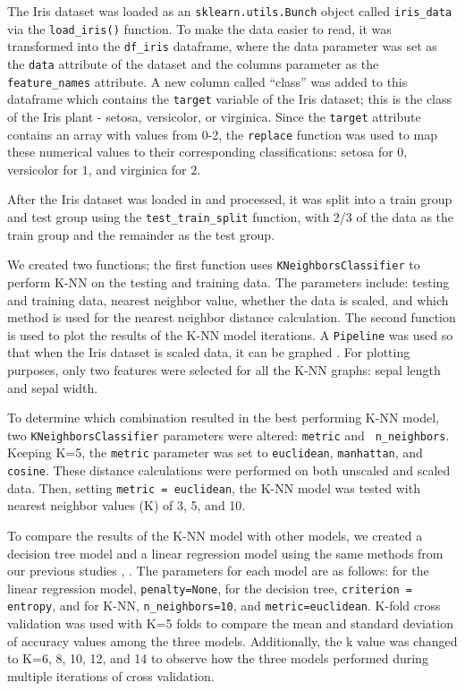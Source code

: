 \documentclass[journal]{IEEEtran}
\begin{document}
The Iris dataset was loaded as an \lstinline{sklearn.utils.Bunch} object called \lstinline{iris_data} via the \lstinline{load_iris()} function. To make the data easier to read, it was transformed into the \lstinline{df_iris} dataframe, where the data parameter was set as the \lstinline{data} attribute of the dataset and the columns parameter as the \lstinline{feature_names} attribute. A new column called “class” was added to this dataframe which contains the \lstinline{target} variable of the Iris dataset; this is the class of the Iris plant - setosa, versicolor, or virginica. Since the \lstinline{target} attribute contains an array with values from 0-2, the \lstinline{replace} function was used to map these numerical values to their corresponding classifications: setosa for \(0\), versicolor for \(1\), and virginica for \(2\). 

After the Iris dataset was loaded in and processed, it was split into a train group and test group using the \lstinline{test_train_split} function, with 2/3 of the data as the train group and the remainder as the test group. 

We created two functions; the first function uses \lstinline{KNeighborsClassifier} to perform K-NN on the testing and training data. The parameters include: testing and training data, nearest neighbor value, whether the data is scaled, and which method is used for the nearest neighbor distance calculation. The second function is used to plot the results of the K-NN model iterations. A \lstinline{Pipeline} was used so that when the Iris dataset is scaled data, it can be graphed \cite{b2}. For plotting purposes, only two features were selected for all the K-NN graphs: sepal length and sepal width. 

To determine which combination resulted in the best performing K-NN model, two \lstinline{KNeighborsClassifier} parameters were altered: \lstinline{metric} and \lstinline{ n_neighbors}. Keeping K=5, the \lstinline{metric} parameter was set to \lstinline{euclidean}, \lstinline{manhattan}, and \lstinline{cosine}. These distance calculations were performed on both unscaled and scaled data. Then, setting \lstinline{metric = euclidean}, the K-NN model was tested with nearest neighbor values (K) of 3, 5, and 10. 

To compare the results of the K-NN model with other models, we created a decision tree model and a linear regression model using the same methods from our previous studies \cite{b3}, \cite{b4}. The parameters for each model are as follows: for the linear regression model, \lstinline{penalty=None}, for the decision tree, \lstinline{criterion = entropy}, and for K-NN, \lstinline{n_neighbors=10}, and \lstinline{metric=euclidean}. K-fold cross validation \cite{b5} was used with K=5 folds to compare the mean and standard deviation of accuracy values among the three models. Additionally, the k value was changed to K=6, 8, 10, 12, and 14 to observe how the three models performed during multiple iterations of cross validation. 
\end{document}
